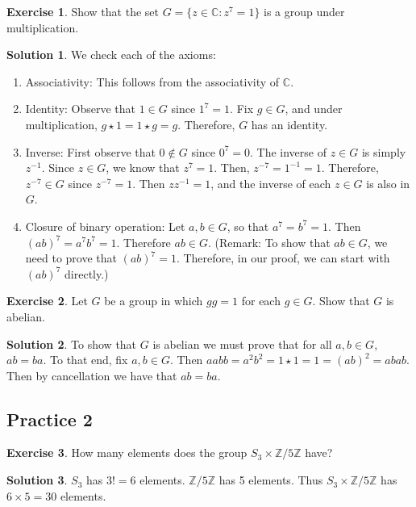 \documentclass[12pt]{article}
\theoremstyle{definition}
\newcommand{\Z}{\mathbb{Z}}
\newtheorem{exercise}{\color{YellowOrange}Exercise}
\theoremstyle{definition}
\newtheorem{solution}{\color{Goldenrod}Solution}
\begin{document}
\begin{exercise}
Show that the set $G = \{z \in \mathbb{C}: z^7 = 1\}$ is a group under multiplication.
\end{exercise}
\begin{solution}
We check each of the axioms:
\begin{enumerate}
\item Associativity: This follows from the associativity of $\mathbb{C}$.
\item Identity: Observe that $1 \in G$ since $1^7 = 1$. Fix $g \in G$, and under multiplication, $g \star 1 = 1 \star g = g$. Therefore, $G$ has an identity.
\item Inverse: First observe that $0 \not\in G$ since $0^7 = 0$. The inverse of $z \in G$ is simply $z^{-1}$. Since $z \in G$, we know that $z^7 = 1$. Then, $z^{-7} = 1^{-1} = 1$. Therefore, $z^{-7} \in G$ since $z^{-7} = 1$. Then $z z^{-1} = 1$, and the inverse of each $z \in G$ is also in $G$.
\item Closure of binary operation: Let $a,b \in G$, so that $a^7 = b^7 = 1$. Then $(ab)^7 = a^7 b^7 = 1$. Therefore $ab \in G$. (Remark: To show that $ab \in G$, we need to prove that $(ab)^7 = 1$. Therefore, in our proof, we can start with $(ab)^7$ directly.)
\end{enumerate}
\end{solution}

\begin{exercise}
Let $G$ be a group in which $gg = 1$ for each $g \in G$. Show that $G$ is abelian.
\end{exercise}
\begin{solution}
To show that $G$ is abelian we must prove that for all $a,b \in G$, $ab = ba$. To that end, fix $a,b \in G$. Then $aabb = a^2 b^2 = 1 \star 1 = 1 = (ab)^2 = abab$. Then by cancellation we have that $ab = ba$.
\end{solution}


\subsection{Practice 2}
\begin{exercise}
How many elements does the group $S_3 \times \mathbb{Z}/5\mathbb{Z}$ have?
\end{exercise}
\begin{solution}
$S_3$ has $3! = 6$ elements. $\Z / 5 \Z$ has 5 elements. Thus $S_3 \times \mathbb{Z}/5\mathbb{Z}$ has $ 6 \times 5 = 30$ elements. 
\end{solution}
\end{document}
